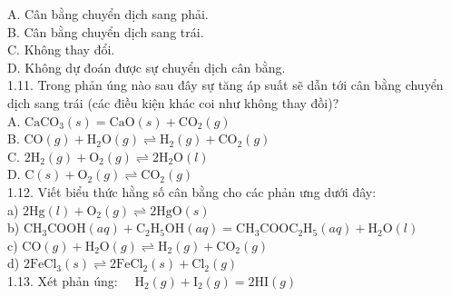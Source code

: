 \documentclass[10pt]{article}
\begin{document}
A. Cân bằng chuyển dịch sang phải.\\
B. Cân bằng chuyển dịch sang trái.\\
C. Không thay đổi.\\
D. Không dự đoán được sự chuyển dịch cân bằng.\\
1.11. Trong phản úng nào sau đây sự tăng áp suất sẽ dẫn tới cân bằng chuyển dịch sang trái (các điều kiện khác coi như không thay đồi)?\\
A. $\mathrm{CaCO}_{3}(s)=\mathrm{CaO}(s)+\mathrm{CO}_{2}(g)$\\
B. $\mathrm{CO}(g)+\mathrm{H}_{2} \mathrm{O}(g) \rightleftharpoons \mathrm{H}_{2}(g)+\mathrm{CO}_{2}(g)$\\
C. $2 \mathrm{H}_{2}(g)+\mathrm{O}_{2}(g) \rightleftharpoons 2 \mathrm{H}_{2} \mathrm{O}(l)$\\
D. $\mathrm{C}(s)+\mathrm{O}_{2}(g) \rightleftharpoons \mathrm{CO}_{2}(g)$\\
1.12. Viết biểu thức hằng số cân bằng cho các phản ưng dưới đây:\\
a) $2 \mathrm{Hg}(l)+\mathrm{O}_{2}(g) \rightleftharpoons 2 \mathrm{HgO}(s)$\\
b) $\mathrm{CH}_{3} \mathrm{COOH}(a q)+\mathrm{C}_{2} \mathrm{H}_{5} \mathrm{OH}(a q)=\mathrm{CH}_{3} \mathrm{COOC}_{2} \mathrm{H}_{5}(a q)+\mathrm{H}_{2} \mathrm{O}(l)$\\
c) $\mathrm{CO}(g)+\mathrm{H}_{2} \mathrm{O}(g) \rightleftharpoons \mathrm{H}_{2}(g)+\mathrm{CO}_{2}(g)$\\
d) $2 \mathrm{FeCl}_{3}(s) \rightleftharpoons 2 \mathrm{FeCl}_{2}(s)+\mathrm{Cl}_{2}(g)$\\
1.13. Xét phản úng: $\quad \mathrm{H}_{2}(g)+\mathrm{I}_{2}(g)=2 \mathrm{HI}(g)$
\end{document}
